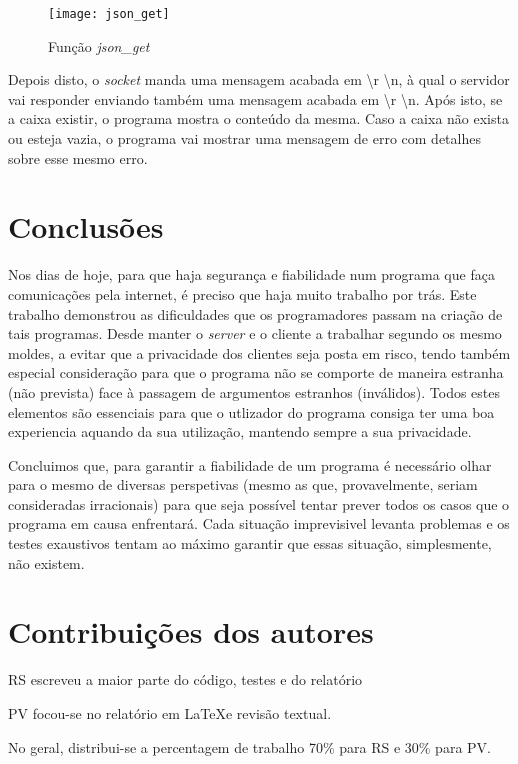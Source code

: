 \documentclass{report}
\begin{document}
\begin{figure}[h]
\center
\texttt{[image: json\_get]}
\caption{Função \textit{json\_get}}
\label{fig:json_get}
\end{figure}

Depois disto, o \textit{socket} manda uma mensagem acabada em \textbackslash r \textbackslash n, à qual o servidor vai responder enviando também uma mensagem acabada em \textbackslash r \textbackslash n. Após isto, se a caixa existir, o programa mostra o conteúdo da mesma. Caso a caixa não exista ou esteja vazia, o programa vai mostrar uma mensagem de erro com detalhes sobre esse mesmo erro.

\newpage
\FloatBarrier
\chapter{Conclusões}
\label{chap.conclusao}
Nos dias de hoje, para que haja segurança e fiabilidade num programa que faça comunicações pela internet, é preciso que haja muito trabalho por trás. Este trabalho demonstrou as dificuldades que os programadores passam na criação de tais programas. Desde manter o \textit{server} e o cliente a trabalhar segundo os mesmo moldes, a evitar que a privacidade dos clientes seja posta em risco, tendo também especial consideração para que o programa não se comporte de maneira estranha (não prevista) face à passagem de argumentos estranhos (inválidos). Todos estes elementos são essenciais para que o utlizador do programa consiga ter uma boa experiencia aquando da sua utilização, mantendo sempre a sua privacidade.

Concluimos que, para garantir a fiabilidade de um programa é necessário olhar para o mesmo de diversas perspetivas (mesmo as que, provavelmente, seriam consideradas irracionais) para que seja possível tentar prever todos os casos que o programa em causa enfrentará. Cada situação imprevisivel levanta problemas e os testes exaustivos tentam ao máximo garantir que essas situação, simplesmente, não existem.
 

\chapter*{Contribuições dos autores}
\label{chap.contribuicao}
RS escreveu a maior parte do código, testes e do relatório

PV focou-se no relatório em \LaTeX e revisão textual.


No geral, distribui-se a percentagem de trabalho 70\% para RS e 30\% para PV.
\end{document}
